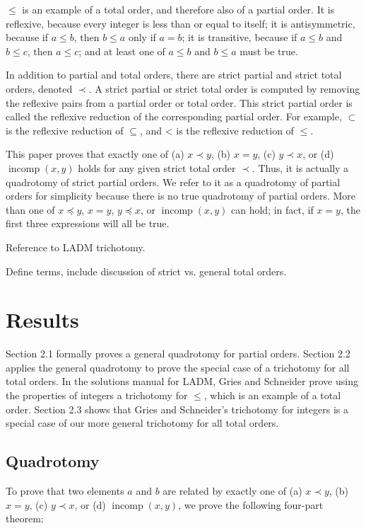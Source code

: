 \documentclass[12pt, fleqn, leqno]{article}
\DeclareMathOperator{\incomp}{incomp}
\begin{document}
$\le$ is an example of a total order, and therefore also of a partial order.
It is reflexive, because every integer is less than or equal to itself; it is antisymmetric, because if $a \le b$, then $b \le a$ only if $a=b$; it is transitive, because if $a \le b$ and $b \le c$, then $a \le c$; and at least one of $a \le b$ and $b \le a$ must be true.

In addition to partial and total orders, there are strict partial and strict total orders, denoted $\prec$.
A strict partial or strict total order is computed by removing the reflexive pairs from a partial order or total order.
This strict partial order is called the reflexive reduction of the corresponding partial order.
For example, $\subset$ is the reflexive reduction of $\subseteq$, and < is the reflexive reduction of $\le$.

This paper proves that exactly one of (a) $x \prec y$, (b) $x=y$, (c) $y\prec x$, or (d) $\incomp(x,y)$ holds for any given strict total order $\prec$.
Thus, it is actually a quadrotomy of strict partial orders.
We refer to it as a quadrotomy of partial orders for simplicity because there is no true quadrotomy of partial orders.
More than one of $x \preceq y$, $x=y$, $y\preceq x$, or $\incomp(x,y)$ can hold; in fact, if $x=y$, the first three expressions will all be true.

Reference to LADM trichotomy.

Define terms, include discussion of strict vs. general total orders.

\section{Results}

Section 2.1 formally proves a general quadrotomy for partial orders.
Section 2.2 applies the general quadrotomy to prove the special case of a trichotomy for all total orders.
In the solutions manual for LADM, Gries and Schneider prove using the properties of integers a trichotomy for $\le$, which is an example of a total order.
Section 2.3 shows that Gries and Schneider's trichotomy for integers is a special case of our more general trichotomy for all total orders.

\subsection{Quadrotomy} \label {Quadrotomy}

To prove that two elements $a$ and $b$ are related by exactly one of (a) $x \prec y$, (b) $x=y$, (c) $y\prec x$, or (d) $\incomp(x,y)$, we prove the following four-part theorem:
\end{document}
